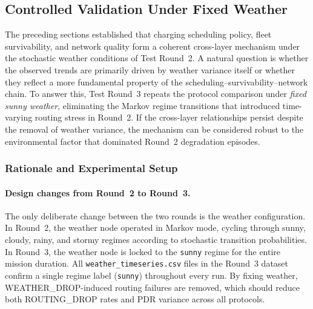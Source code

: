 
\subsection{Controlled Validation Under Fixed Weather}
\label{sec:results:controlled-validation}

The preceding sections established that charging scheduling policy,
fleet survivability, and network quality form a coherent cross-layer
mechanism under the stochastic weather conditions of Test Round~2.
A natural question is whether the observed trends are primarily driven
by weather variance itself or whether they reflect a more fundamental
property of the scheduling--survivability--network chain.
To answer this, Test Round~3 repeats the protocol comparison under
\emph{fixed sunny weather}, eliminating the Markov regime transitions
that introduced time-varying routing stress in Round~2.
If the cross-layer relationships persist despite the removal of weather
variance, the mechanism can be considered robust to the environmental
factor that dominated Round~2 degradation episodes.

\subsubsection{Rationale and Experimental Setup}
\label{sec:results:controlled-validation:setup}

\paragraph{Design changes from Round~2 to Round~3.}
The only deliberate change between the two rounds is the weather
configuration.  In Round~2, the weather node operated in Markov mode,
cycling through sunny, cloudy, rainy, and stormy regimes according to
stochastic transition probabilities.  In Round~3, the weather node is
locked to the \texttt{sunny} regime for the entire mission duration.
All \texttt{weather\_timeseries.csv} files in the Round~3 dataset
confirm a single regime label (\texttt{sunny}) throughout every run.
By fixing weather, WEATHER\_DROP-induced routing failures are removed,
which should reduce both ROUTING\_DROP rates and PDR variance across
all protocols.

